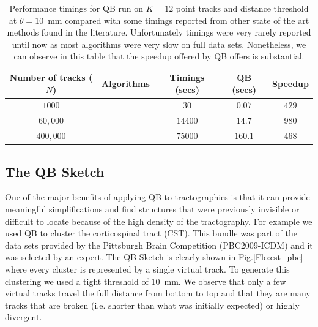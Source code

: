 \documentclass[preprint,authoryear,a4paper,10pt,onecolumn]{elsarticle}
\begin{document}
%
\begin{table}
\small\addtolength{\tabcolsep}{-5pt}

\begin{centering}
\begin{tabular}{ccccc}
\hline 
Number of tracks ($N$) & Algorithms & Timings (secs) & QB (secs) & Speedup\tabularnewline
\hline
\hline 
$1000$ & \citet{wang2010tractography} & $30$ & $0.07$ & $429$\tabularnewline
\hline 
$60,000$ & \citet{wang2010tractography} & $14400$ & $14.7$ & $980$\tabularnewline
\hline 
$400,000$ & \citet{Visser2010} & $75000$ & $160.1$ & $468$\tabularnewline
\hline
\end{tabular}
\par\end{centering}
\caption{Performance timings for QB run on $K=12$ point tracks and
  distance threshold at $\theta=10$~mm compared with some timings
  reported from other state of the art methods found in the
  literature. Unfortunately timings were very rarely reported until now
  as most algorithms were very slow on full data sets. Nonetheless, we
  can observe in this table that the speedup offered by QB offers is
  substantial.\label{Flo:timings}}
\end{table}

\subsection{The QB Sketch}

One of the major benefits of applying QB to tractographies is that it
can provide meaningful simplifications and find structures that were
previously invisible or difficult to locate because of the high density
of the tractography. For example we used QB to cluster the corticospinal
tract (CST). This bundle was part of the data sets provided by the
Pittsburgh Brain Competition (PBC2009-ICDM) and it was selected by an
expert. The QB Sketch is clearly shown in Fig.\ref{Flo:cst_pbc} where
every cluster is represented by a single virtual track. To generate this
clustering we used a tight threshold of $10$~mm. We observe that only a
few virtual tracks travel the full distance from bottom to top and that
they are many tracks that are broken (i.e. shorter than what was
initially expected) or highly divergent.
\end{document}
